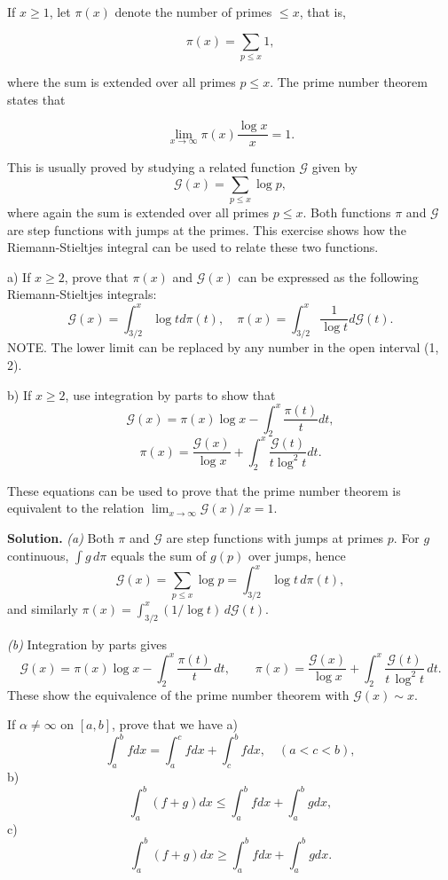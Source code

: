 \begin{problembox}
If $x \geq 1$, let $\pi(x)$ denote the number of primes $\leq x$, that is,

\[ \pi(x) = \sum_{p \leq x} 1, \]

where the sum is extended over all primes $p \leq x$. The prime number theorem states that

\[ \lim_{x \to \infty} \pi(x) \frac{\log x}{x} = 1. \]

This is usually proved by studying a related function $\mathcal{G}$ given by
\[\mathcal{G}(x) = \sum_{p \leq x} \log p,\]
where again the sum is extended over all primes $p \leq x$. Both functions $\pi$ and $\mathcal{G}$ are step functions with jumps at the primes. This exercise shows how the Riemann-Stieltjes integral can be used to relate these two functions.

a) If $x \geq 2$, prove that $\pi(x)$ and $\mathcal{G}(x)$ can be expressed as the following Riemann-Stieltjes integrals:
\[\mathcal{G}(x) = \int_{3/2}^{x} \log t d\pi(t), \quad \pi(x) = \int_{3/2}^{x} \frac{1}{\log t} d\mathcal{G}(t).\]
NOTE. The lower limit can be replaced by any number in the open interval (1, 2).

b) If $x \geq 2$, use integration by parts to show that
\[\mathcal{G}(x) = \pi(x) \log x - \int_{2}^{x} \frac{\pi(t)}{t} dt,\]
\[\pi(x) = \frac{\mathcal{G}(x)}{\log x} + \int_{2}^{x} \frac{\mathcal{G}(t)}{t \log^{2} t} dt.\]

These equations can be used to prove that the prime number theorem is equivalent to the relation $\lim_{x \to \infty} \mathcal{G}(x)/x = 1$.
\end{problembox}

\noindent\textbf{Solution.}
\textit{(a)} Both $\pi$ and $\mathcal{G}$ are step functions with jumps at primes $p$. For $g$ continuous, $\int g\,d\pi$ equals the sum of $g(p)$ over jumps, hence
\[\mathcal{G}(x)=\sum_{p\le x}\log p=\int_{3/2}^{x} \log t\,d\pi(t),\]
and similarly $\pi(x)=\int_{3/2}^{x} (1/\log t)\,d\mathcal{G}(t)$.

\textit{(b)} Integration by parts gives
\[\mathcal{G}(x)=\pi(x)\log x-\int_2^x \frac{\pi(t)}{t}\,dt,\qquad \pi(x)=\frac{\mathcal{G}(x)}{\log x}+\int_2^x \frac{\mathcal{G}(t)}{t\,\log^2 t}\,dt.
\]
These show the equivalence of the prime number theorem with $\mathcal{G}(x)\sim x$.
\medskip

\begin{problembox}
If $\alpha \neq \infty$ on $[a, b]$, prove that we have
a) \[\int_{a}^{b} f dx = \int_{a}^{c} f dx + \int_{c}^{b} f dx, \quad (a < c < b),\]
b) \[\int_{a}^{b} (f + g) dx \leq \int_{a}^{b} f dx + \int_{a}^{b} g dx,\]
c) \[\int_{a}^{b} (f + g) dx \geq \int_{a}^{b} f dx + \int_{a}^{b} g dx.\]
\end{problembox}


